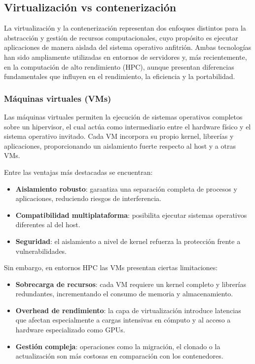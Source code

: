 \subsection{Virtualización vs contenerización}\label{subsec:virtualizacion_contenedores}

La virtualización y la contenerización representan dos enfoques distintos para la abstracción y gestión de recursos computacionales, cuyo propósito es ejecutar aplicaciones de manera aislada del sistema operativo anfitrión. Ambas tecnologías han sido ampliamente utilizadas en entornos de servidores y, más recientemente, en la computación de alto rendimiento (\acs{HPC}), aunque presentan diferencias fundamentales que influyen en el rendimiento, la eficiencia y la portabilidad.

\subsubsection{Máquinas virtuales (VMs)}

Las máquinas virtuales permiten la ejecución de sistemas operativos completos sobre un hipervisor, el cual actúa como intermediario entre el hardware físico y el sistema operativo invitado. Cada VM incorpora su propio kernel, librerías y aplicaciones, proporcionando un aislamiento fuerte respecto al host y a otras VMs.

Entre las ventajas más destacadas se encuentran:
\begin{itemize}
    \item \textbf{Aislamiento robusto}: garantiza una separación completa de procesos y aplicaciones, reduciendo riesgos de interferencia.
    \item \textbf{Compatibilidad multiplataforma}: posibilita ejecutar sistemas operativos diferentes al del host.
    \item \textbf{Seguridad}: el aislamiento a nivel de kernel refuerza la protección frente a vulnerabilidades.
\end{itemize}

Sin embargo, en entornos HPC las VMs presentan ciertas limitaciones:
\begin{itemize}
    \item \textbf{Sobrecarga de recursos}: cada VM requiere un kernel completo y librerías redundantes, incrementando el consumo de memoria y almacenamiento.
    \item \textbf{Overhead de rendimiento}: la capa de virtualización introduce latencias que afectan especialmente a cargas intensivas en cómputo y al acceso a hardware especializado como GPUs.
    \item \textbf{Gestión compleja}: operaciones como la migración, el clonado o la actualización son más costosas en comparación con los contenedores.
\end{itemize}

